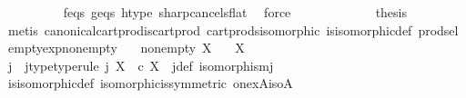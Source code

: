 \begin{isabellebody}
\ \ \ \ \ \ \ \ \isamarkupfalse%
\ f{\isacharunderscore}{\kern0pt}eqs\ g{\isacharunderscore}{\kern0pt}eqs\ h{\isacharunderscore}{\kern0pt}type\ sharp{\isacharunderscore}{\kern0pt}cancels{\isacharunderscore}{\kern0pt}flat\ \isamarkupfalse%
\ force\isanewline
\ \ \ \ \isamarkupfalse%
\isanewline
\ \ \isamarkupfalse%
\isanewline
\ \ \isamarkupfalse%
\ \isamarkupfalse%
\ {\isacharquery}{\kern0pt}thesis\isanewline
\ \ \ \ \isamarkupfalse%
\ {\isacharparenleft}{\kern0pt}metis\ canonical{\isacharunderscore}{\kern0pt}cart{\isacharunderscore}{\kern0pt}prod{\isacharunderscore}{\kern0pt}is{\isacharunderscore}{\kern0pt}cart{\isacharunderscore}{\kern0pt}prod\ cart{\isacharunderscore}{\kern0pt}prods{\isacharunderscore}{\kern0pt}isomorphic\ is{\isacharunderscore}{\kern0pt}isomorphic{\isacharunderscore}{\kern0pt}def\ prod{\isachardot}{\kern0pt}sel{\isacharparenleft}{\kern0pt}{}{\isacharcomma}{\kern0pt}{}{\isacharparenright}{\kern0pt}{\isacharparenright}{\kern0pt}\isanewline
{}\isamarkupfalse%
%
\endisatagproof
{\isafoldproof}%
%
\isadelimproof
\isanewline
%
\endisadelimproof
\isanewline
{}\isamarkupfalse%
\ empty{\isacharunderscore}{\kern0pt}exp{\isacharunderscore}{\kern0pt}nonempty{\isacharcolon}{\kern0pt}\isanewline
\ \ \ {\isachardoublequoteopen}nonempty\ X{\isachardoublequoteclose}\isanewline
\ \ \ {\isachardoublequoteopen}{\isasymemptyset}\isactrlbsup X\isactrlesup \ {\isasymcong}\ {\isasymemptyset}{\isachardoublequoteclose}\isanewline
%
\isadelimproof
%
\endisadelimproof
%
\isatagproof
{}\isamarkupfalse%
{\isacharminus}{\kern0pt}\isanewline
\ \ \isamarkupfalse%
\ j\ \ j{\isacharunderscore}{\kern0pt}type{\isacharbrackleft}{\kern0pt}type{\isacharunderscore}{\kern0pt}rule{\isacharbrackright}{\kern0pt}{\isacharcolon}{\kern0pt}\ {\isachardoublequoteopen}j{\isacharcolon}{\kern0pt}\ {\isasymemptyset}\isactrlbsup X\isactrlesup \ {\isasymrightarrow}\ {\isasymone}{\isasymtimes}\isactrlsub c\ {\isasymemptyset}\isactrlbsup X\isactrlesup {\isachardoublequoteclose}\ \ j{\isacharunderscore}{\kern0pt}def{\isacharcolon}{\kern0pt}\ {\isachardoublequoteopen}isomorphism{\isacharparenleft}{\kern0pt}j{\isacharparenright}{\kern0pt}{\isachardoublequoteclose}\isanewline
\ \ \ \ \isamarkupfalse%
\ is{\isacharunderscore}{\kern0pt}isomorphic{\isacharunderscore}{\kern0pt}def\ isomorphic{\isacharunderscore}{\kern0pt}is{\isacharunderscore}{\kern0pt}symmetric\ one{\isacharunderscore}{\kern0pt}x{\isacharunderscore}{\kern0pt}A{\isacharunderscore}{\kern0pt}iso{\isacharunderscore}{\kern0pt}A\ \isamarkupfalse%

\end{isabellebody}
